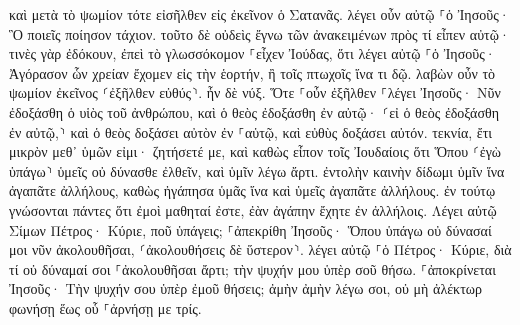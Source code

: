 \documentclass[twoside, 9pt]{extreport}
\begin{document}
καὶ μετὰ τὸ ψωμίον τότε εἰσῆλθεν εἰς ἐκεῖνον ὁ Σατανᾶς. λέγει οὖν αὐτῷ ⸀ὁ Ἰησοῦς· Ὃ ποιεῖς ποίησον τάχιον. 
τοῦτο δὲ οὐδεὶς ἔγνω τῶν ἀνακειμένων πρὸς τί εἶπεν αὐτῷ· 
τινὲς γὰρ ἐδόκουν, ἐπεὶ τὸ γλωσσόκομον ⸀εἶχεν Ἰούδας, ὅτι λέγει αὐτῷ ⸀ὁ Ἰησοῦς· Ἀγόρασον ὧν χρείαν ἔχομεν εἰς τὴν ἑορτήν, ἢ τοῖς πτωχοῖς ἵνα τι δῷ. 
λαβὼν οὖν τὸ ψωμίον ἐκεῖνος ⸂ἐξῆλθεν εὐθύς⸃. ἦν δὲ νύξ. 
Ὅτε ⸀οὖν ἐξῆλθεν ⸀λέγει Ἰησοῦς· Νῦν ἐδοξάσθη ὁ υἱὸς τοῦ ἀνθρώπου, καὶ ὁ θεὸς ἐδοξάσθη ἐν αὐτῷ· 
⸂εἰ ὁ θεὸς ἐδοξάσθη ἐν αὐτῷ,⸃ καὶ ὁ θεὸς δοξάσει αὐτὸν ἐν ⸀αὑτῷ, καὶ εὐθὺς δοξάσει αὐτόν. 
τεκνία, ἔτι μικρὸν μεθ᾽ ὑμῶν εἰμι· ζητήσετέ με, καὶ καθὼς εἶπον τοῖς Ἰουδαίοις ὅτι Ὅπου ⸂ἐγὼ ὑπάγω⸃ ὑμεῖς οὐ δύνασθε ἐλθεῖν, καὶ ὑμῖν λέγω ἄρτι. 
ἐντολὴν καινὴν δίδωμι ὑμῖν ἵνα ἀγαπᾶτε ἀλλήλους, καθὼς ἠγάπησα ὑμᾶς ἵνα καὶ ὑμεῖς ἀγαπᾶτε ἀλλήλους. 
ἐν τούτῳ γνώσονται πάντες ὅτι ἐμοὶ μαθηταί ἐστε, ἐὰν ἀγάπην ἔχητε ἐν ἀλλήλοις. 
Λέγει αὐτῷ Σίμων Πέτρος· Κύριε, ποῦ ὑπάγεις; ⸀ἀπεκρίθη Ἰησοῦς· Ὅπου ὑπάγω οὐ δύνασαί μοι νῦν ἀκολουθῆσαι, ⸂ἀκολουθήσεις δὲ ὕστερον⸃. 
λέγει αὐτῷ ⸀ὁ Πέτρος· Κύριε, διὰ τί οὐ δύναμαί σοι ⸀ἀκολουθῆσαι ἄρτι; τὴν ψυχήν μου ὑπὲρ σοῦ θήσω. 
⸀ἀποκρίνεται Ἰησοῦς· Τὴν ψυχήν σου ὑπὲρ ἐμοῦ θήσεις; ἀμὴν ἀμὴν λέγω σοι, οὐ μὴ ἀλέκτωρ φωνήσῃ ἕως οὗ ⸀ἀρνήσῃ με τρίς. 
\end{document}
